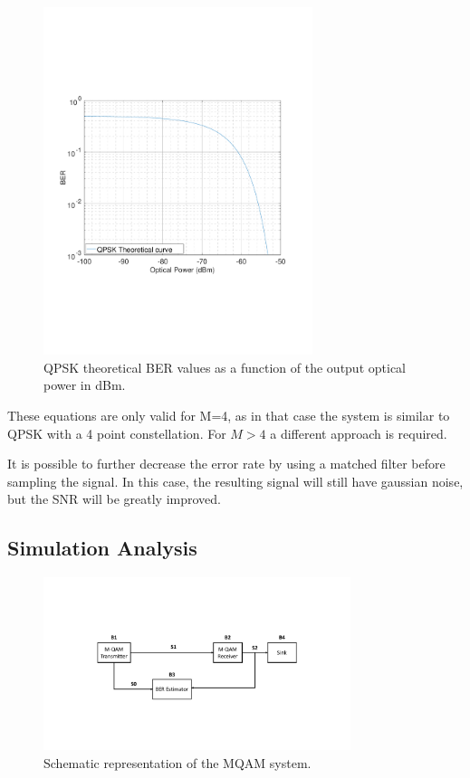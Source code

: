 \begin{figure}[h]
		\centering
		\includegraphics[clip, trim=2cm 6cm 2cm 6cm, width=0.7\textwidth]{./sdf/m_qam_system/figures/BER_QPSK_theory_20180119.pdf}
		\caption{QPSK theoretical BER values as a function of the output optical power in dBm.}
		\label{fig:QPSK_th_curve}
\end{figure}

These equations are only valid for M=4, as in that case the system is similar to QPSK with a 4 point constellation. For $M > 4$ a different approach is required.

It is possible to further decrease the error rate by using a matched filter before sampling the signal. In this case, the resulting signal will still have gaussian noise, but the SNR will be greatly improved.


\pagebreak
\subsection{Simulation Analysis}

\begin{figure}[h]
	\centering
	\includegraphics[width=0.8\textwidth]{./sdf/m_qam_system/figures/MQAM_system_block_diagram}
	\caption{Schematic representation of the MQAM system.}\label{MQAM_system_block_diagram}
\end{figure}

